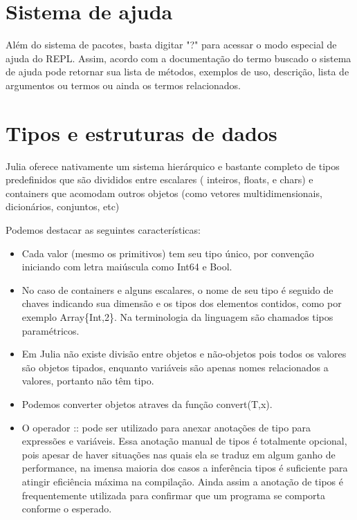 \section{Sistema de ajuda}
Além do sistema de pacotes, basta digitar "?" para acessar o modo especial de ajuda do REPL. Assim, acordo com a documentação do termo buscado o sistema de ajuda pode retornar sua lista de métodos, exemplos de uso, descrição, lista de argumentos ou termos ou ainda os termos relacionados.


\section{Tipos e estruturas de dados}
Julia oferece nativamente um sistema hierárquico e bastante completo de tipos predefinidos que são divididos entre escalares ( inteiros, floats, e chars) e containers que acomodam outros objetos (como vetores multidimensionais, dicionários, conjuntos, etc)

Podemos destacar as seguintes características\cite{Lobianco2019}: 
\begin{itemize}
    \item Cada valor (mesmo os primitivos) tem seu tipo único, por convenção iniciando com letra maiúscula como Int64 e Bool. 
    \item No caso de containers e alguns escalares, o nome de seu tipo é seguido de chaves indicando sua dimensão e os tipos dos elementos contidos, como por exemplo Array\{Int,2\}. Na terminologia da linguagem são chamados tipos paramétricos.  
    \item Em Julia não existe divisão entre objetos e não-objetos pois todos os valores são objetos tipados, enquanto variáveis são apenas nomes relacionados a valores, portanto não têm tipo. 
    \item Podemos converter objetos atraves da função convert(T,x).
    \item O operador :: pode ser utilizado para anexar anotações de tipo para expressões e variáveis. Essa anotação manual de tipos é totalmente opcional, pois apesar de haver situações nas quais ela se traduz em algum ganho de performance, na imensa maioria dos casos a inferência tipos é suficiente para atingir eficiência máxima na compilação. Ainda assim a anotação de tipos é frequentemente utilizada para confirmar que um programa se comporta conforme o esperado. \cite{Bezanson2017}
    
\end{itemize}

